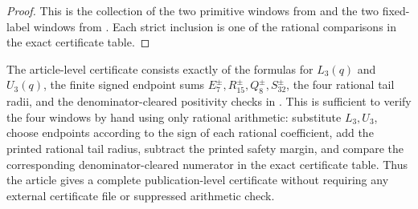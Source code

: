 \begin{proof}
  This is the collection of the two primitive windows from
   and the two fixed-label windows
  from .  Each strict inclusion is
  one of the rational comparisons in the exact certificate table.
\end{proof}

\begin{remark}
\label{prop:s3-finite-exact-arithmetic-reproducibility}
  The article-level certificate consists exactly of the formulas for
  \(L_3(q)\) and \(U_3(q)\), the finite signed endpoint sums
  \(E_7^\pm,R_{15}^\pm,Q_8^\pm,S_{32}^\pm\), the four rational tail radii, and
  the denominator-cleared positivity checks in
  .  This is sufficient to
  verify the four windows by hand using only rational arithmetic: substitute
  \(L_3,U_3\), choose endpoints according to the sign of each rational
  coefficient, add the printed rational tail radius, subtract the printed
  safety margin, and compare the corresponding denominator-cleared numerator
  in the exact certificate table.  Thus the article gives a complete
  publication-level certificate without requiring any external certificate
  file or suppressed arithmetic check.
\end{remark}
